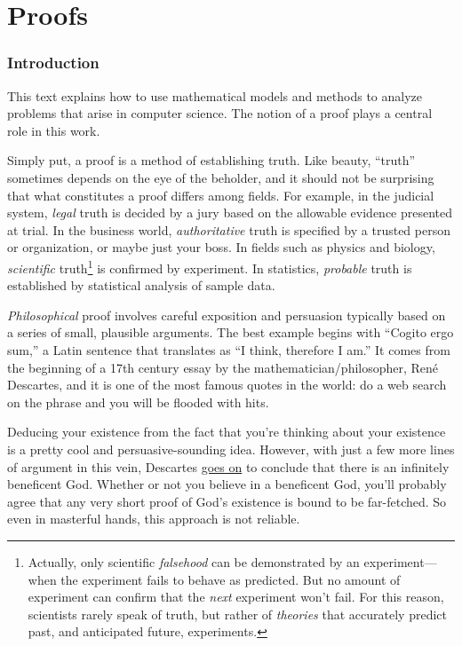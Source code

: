 \part{Proofs}
\label{part:proofs}

\clearpage

\section*{Introduction}

This text explains how to use mathematical models and methods to
analyze problems that arise in computer science.  The notion of a
proof plays a central role in this work.

Simply put, a proof is a method of establishing truth.  Like beauty,
``truth'' sometimes depends on the eye of the beholder, and
it should not be surprising that what constitutes a proof differs
among fields.  For example, in the judicial system, \emph{legal} truth
is decided by a jury based on the allowable evidence presented at
trial.  In the business world, \emph{authoritative} truth is specified
by a trusted person or organization, or maybe just your boss.  In
fields such as physics and biology, \emph{scientific}
truth\footnote{Actually, only scientific
\emph{falsehood} can be demonstrated by an experiment---when
the experiment fails to behave as predicted.  But no amount of
experiment can confirm that the \emph{next} experiment won't fail.
For this reason, scientists rarely speak of truth, but rather
of \emph{theories} that accurately predict past, and anticipated
future, experiments.} is confirmed by experiment.  In
statistics, \emph{probable} truth is established by statistical
analysis of sample data.

\emph{Philosophical} proof involves careful exposition and
persuasion typically based on a series of small, plausible arguments.
The best example begins with ``Cogito ergo sum,'' a Latin sentence
that translates as ``I think, therefore I am.''  It comes from the
beginning of a 17th century essay by the mathematician/philosopher,
Ren\'e Descartes, and it is one of the most famous quotes in the
world: do a web search on the phrase and you will be flooded with
hits.

Deducing your existence from the fact that you're thinking about your
existence is a pretty cool and persuasive-sounding idea.
However, with just a few more lines of argument in this vein, Descartes
\href{http://www.btinternet.com/~glynhughes/squashed/descartes.htm}{goes
  on} to conclude that there is an infinitely beneficent God.  Whether
or not you believe in a beneficent God, you'll probably agree that any
very short proof of God's existence is bound to be far-fetched.  So even
in masterful hands, this approach is not reliable.

